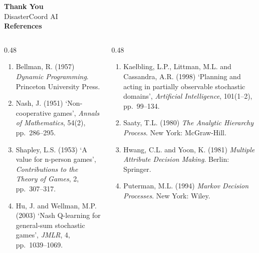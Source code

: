 \documentclass[aspectratio=169,11pt]{beamer}
\begin{document}
\begin{frame}[plain]
  \centering
  \vspace{0.4em}
  {\color{accent}\Huge\textbf{Thank You}}\\[0.2em]
  {\color{ink}\large DisasterCoord AI}\\[0.6em]

  {\color{accent2}\small\textbf{References}}
  \vspace{0.2em}

  \scriptsize
  \begin{columns}[T]
    \begin{column}{0.48\textwidth}
      \begin{enumerate}\setlength\itemsep{0.25em}
        \item Bellman, R. (1957) \textit{Dynamic Programming}.
              Princeton University Press.
        \item Nash, J. (1951) `Non-cooperative games', \textit{Annals
              of Mathematics}, 54(2), pp.~286–295.
        \item Shapley, L.S. (1953) `A value for n-person games',
              \textit{Contributions to the Theory of Games}, 2,
              pp.~307–317.
        \item Hu, J. and Wellman, M.P. (2003) `Nash Q-learning for
              general-sum stochastic games', \textit{JMLR}, 4,
              pp.~1039–1069.
      \end{enumerate}
    \end{column}
    \begin{column}{0.48\textwidth}
      \begin{enumerate}\setlength\itemsep{0.25em}\setcounter{enumi}{4}
        \item Kaelbling, L.P., Littman, M.L. and Cassandra, A.R.
              (1998) `Planning and acting in partially observable
              stochastic domains', \textit{Artificial Intelligence},
              101(1–2), pp.~99–134.
        \item Saaty, T.L. (1980) \textit{The Analytic Hierarchy
              Process}. New York: McGraw-Hill.
        \item Hwang, C.L. and Yoon, K. (1981) \textit{Multiple
              Attribute Decision Making}. Berlin: Springer.
        \item Puterman, M.L. (1994) \textit{Markov Decision
              Processes}. New York: Wiley.
      \end{enumerate}
    \end{column}
  \end{columns}


\end{frame}
\end{document}
